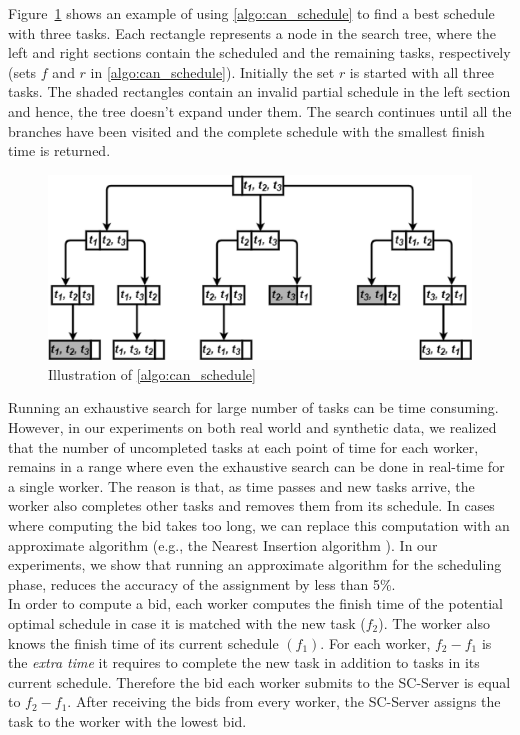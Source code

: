 Figure~\ref{fig:bAndb} shows an example of using \cref{algo:can_schedule} to find a best schedule with three tasks. Each rectangle represents a node in the search tree, where the left and right sections contain the scheduled and the remaining tasks, respectively (sets $f$ and $r$ in \cref{algo:can_schedule}). Initially the set $r$ is started with all three tasks. The shaded rectangles contain an invalid partial schedule in the left section and hence, the tree doesn't expand under them. The search continues until all the branches have been visited and the complete schedule with the smallest finish time is returned.\\

\begin{figure}[!ht]
	\centering
	\includegraphics[width=0.95\columnwidth]{figures/bAndb}
	\vspace{-0mm}\caption{Illustration of \cref{algo:can_schedule}} \vspace{-2mm} \label{fig:bAndb}
\end{figure}\vspace{-0mm}

Running an exhaustive search for large number of tasks can be time consuming. However, in our experiments on both real world and synthetic data, we realized that the number of uncompleted tasks at each point of time for each worker, remains in a range where even the exhaustive search can be done in real-time for a single worker. The reason is that, as time passes and new tasks arrive, the worker also completes other tasks and removes them from its schedule. In cases where computing the bid takes too long, we can replace this computation with an approximate algorithm (e.g., the Nearest Insertion algorithm \cite{Rosenkrantz74}). In our experiments, we show that running an approximate algorithm for the scheduling phase, reduces the accuracy of the assignment by less than 5\%. \\

In order to compute a bid, each worker computes the finish time of the potential optimal schedule in case it is matched with the new task ($f_2$). The worker also knows the finish time of its current schedule $(f_1)$. For each worker, $f_2-f_1$ is the \textit{extra time} it requires to complete the new task in addition to tasks in its current schedule. Therefore the bid each worker submits to the SC-Server is equal to $f_2 - f_1$. After receiving the bids from every worker, the SC-Server assigns the task to the worker with the lowest bid.\\

